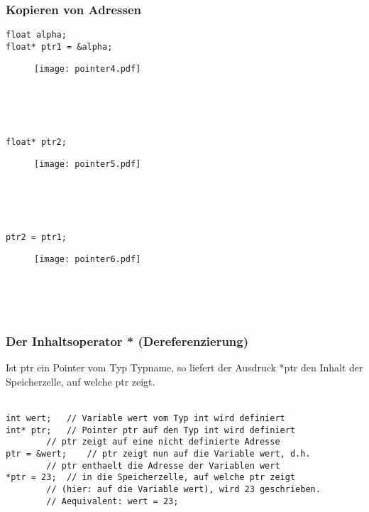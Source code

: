 \subsubsection{Kopieren von Adressen\hfill}
\label{sec:unterunterabschnitt}
\noindent
\begin{minipage}{\linewidth}
\begin{lstlisting}
float alpha;
float* ptr1 = &alpha;
\end{lstlisting}
\end{minipage}
\begin{figure}[h!]
	\centering
	\texttt{[image: pointer4.pdf]}
\end{figure}
\\ \\ \\
\noindent
\begin{minipage}{\linewidth}
\begin{lstlisting}
float* ptr2;
\end{lstlisting}
\end{minipage}
\begin{figure}[h!]
	\centering
	\texttt{[image: pointer5.pdf]}
\end{figure}
\\ \\ \\
\noindent
\begin{minipage}{\linewidth}
\begin{lstlisting}
ptr2 = ptr1;
\end{lstlisting}
\end{minipage}
\begin{figure}[h!]
	\centering
	\texttt{[image: pointer6.pdf]}
\end{figure}
\\ \\ \\

\subsubsection{Der Inhaltsoperator * \textbf{(Dereferenzierung)}\hfill}
\label{sec:unterunterabschnitt}
Ist ptr ein Pointer vom Typ Typname, so liefert der Ausdruck *ptr den Inhalt der Speicherzelle, auf welche ptr zeigt.\\
\\
\noindent
\begin{minipage}{\linewidth}
\begin{lstlisting}
int wert;	// Variable wert vom Typ int wird definiert
int* ptr;	// Pointer ptr auf den Typ int wird definiert
		// ptr zeigt auf eine nicht definierte Adresse
ptr = &wert;	// ptr zeigt nun auf die Variable wert, d.h.
		// ptr enthaelt die Adresse der Variablen wert
*ptr = 23;	// in die Speicherzelle, auf welche ptr zeigt
		// (hier: auf die Variable wert), wird 23 geschrieben.
		// Aequivalent: wert = 23;
\end{lstlisting}
\end{minipage}

